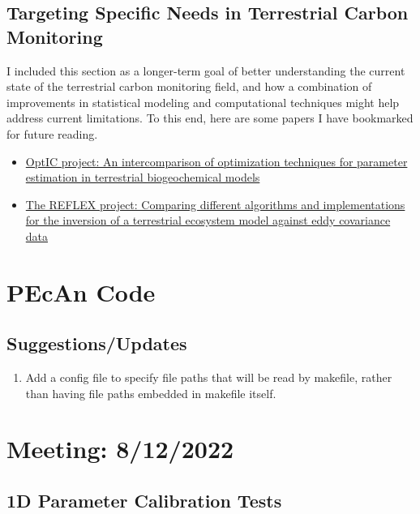 \documentclass[12pt]{article}
\begin{document}
\subsection{Targeting Specific Needs in Terrestrial Carbon Monitoring}
I included this section as a longer-term goal of better understanding the current state of the terrestrial carbon monitoring field, and how a combination 
of improvements in statistical modeling and computational techniques might help address current limitations. To this end, here are some papers I have bookmarked 
for future reading. 
\begin{itemize}
\item \href{https://www.globalcarbonproject.org/global/pdf/trudinger.07_opti_jgr.pdf}{OptIC project: An intercomparison of optimization techniques for parameter estimation in terrestrial biogeochemical models}
\item \href{https://centaur.reading.ac.uk/28464/1/Fox_etal.REFLEX.AFM.2009.pdf}{The REFLEX project: Comparing different algorithms and implementations for the inversion of a terrestrial ecosystem model against eddy covariance data}
\end{itemize}

\section{PEcAn Code}
\subsection{Suggestions/Updates}
\begin{enumerate}
\item Add a config file to specify file paths that will be read by makefile, rather than having file paths embedded in makefile itself. 
\end{enumerate}

\section{Meeting: 8/12/2022}
\subsection{1D Parameter Calibration Tests}
\end{document}
